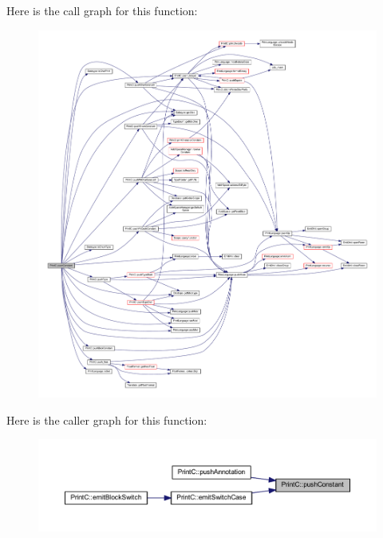 Here is the call graph for this function\+:
\nopagebreak
\begin{figure}[H]
\begin{center}
\leavevmode
\includegraphics[width=350pt]{class_print_c_a3db658db938d08395a6e54d3b1c7a372_cgraph}
\end{center}
\end{figure}
Here is the caller graph for this function\+:
\nopagebreak
\begin{figure}[H]
\begin{center}
\leavevmode
\includegraphics[width=350pt]{class_print_c_a3db658db938d08395a6e54d3b1c7a372_icgraph}
\end{center}
\end{figure}
\mbox{\label{class_print_c_a70078a4551cf53bafcb44360afd2f027}} 

